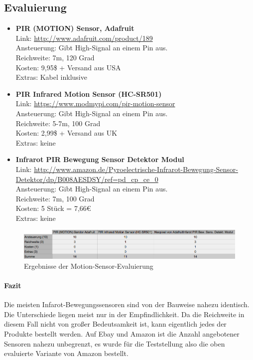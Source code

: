 \subsection{Evaluierung}
\begin{itemize}
\item \textbf{PIR (MOTION) Sensor, Adafruit}\\
Link: \url{http://www.adafruit.com/product/189}\\
Ansteuerung: Gibt High-Signal an einem Pin aus.\\
Reichweite: 7m, 120 Grad\\
Kosten: 9,95\$ + Versand aus USA\\
Extras: Kabel inklusive\\
\item \textbf{PIR Infrared Motion Sensor (HC-SR501)}\\
Link: \url{https://www.modmypi.com/pir-motion-sensor}\\
Ansteuerung: Gibt High-Signal an einem Pin aus.\\
Reichweite: 5-7m, 100 Grad\\
Kosten: 2,99\$ + Versand aus UK\\
Extras: keine\\
\item \textbf{Infrarot PIR Bewegung Sensor Detektor Modul}\\
Link: \url{http://www.amazon.de/Pyroelectrische-Infrarot-Bewegung-Sensor-Detektor/dp/B008AESDSY/ref=pd\_cp\_ce\_0}\\
Ansteuerung: Gibt High-Signal an einem Pin aus.\\
Reichweite: 7m, 100 Grad\\
Kosten: 5 Stück = 7,66€\\
Extras: keine\\
\end{itemize}
\begin{figure}[h]
\begin{minipage}{\textwidth}
            \centering
            \includegraphics[width=\textwidth]{./data/evaluierung-ms.png}
            \caption{Ergebnisse der Motion-Sensor-Evaluierung}
        \end{minipage}
\end{figure}
\paragraph{Fazit}
Die meisten Infarot-Bewegungssensoren sind von der Bauweise nahezu identisch. Die Unterschiede liegen meist nur in der Empfindlichkeit. Da die Reichweite in diesem Fall nicht von großer Bedeutsamkeit ist, kann eigentlich jedes der Produkte bestellt werden. Auf Ebay und Amazon ist die Anzahl angebotener Sensoren nahezu unbegrenzt, es wurde für die Teststellung also die oben evaluierte Variante von Amazon bestellt. 
